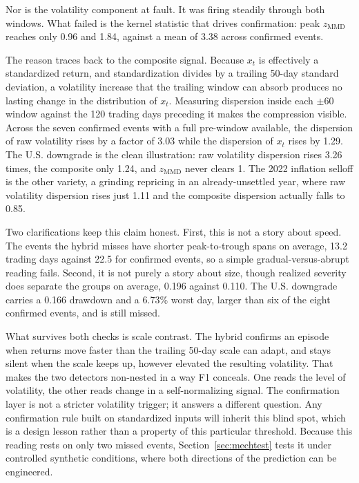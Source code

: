 \documentclass[pdflatex,sn-mathphys-num,iicol]{sn-jnl}
\begin{document}
Nor is the volatility component at fault. It was firing steadily through both windows. What failed is the kernel statistic that drives confirmation: peak $z_{\mathrm{MMD}}$ reaches only 0.96 and 1.84, against a mean of 3.38 across confirmed events.

The reason traces back to the composite signal. Because $x_t$ is effectively a standardized return, and standardization divides by a trailing 50-day standard deviation, a volatility increase that the trailing window can absorb produces no lasting change in the distribution of $x_t$. Measuring dispersion inside each $\pm60$ window against the 120 trading days preceding it makes the compression visible. Across the seven confirmed events with a full pre-window available, the dispersion of raw volatility rises by a factor of 3.03 while the dispersion of $x_t$ rises by 1.29. The U.S. downgrade is the clean illustration: raw volatility dispersion rises 3.26 times, the composite only 1.24, and $z_{\mathrm{MMD}}$ never clears 1. The 2022 inflation selloff is the other variety, a grinding repricing in an already-unsettled year, where raw volatility dispersion rises just 1.11 and the composite dispersion actually falls to 0.85.

Two clarifications keep this claim honest. First, this is not a story about speed. The events the hybrid misses have shorter peak-to-trough spans on average, 13.2 trading days against 22.5 for confirmed events, so a simple gradual-versus-abrupt reading fails. Second, it is not purely a story about size, though realized severity does separate the groups on average, 0.196 against 0.110. The U.S. downgrade carries a 0.166 drawdown and a 6.73\% worst day, larger than six of the eight confirmed events, and is still missed.

What survives both checks is scale contrast. The hybrid confirms an episode when returns move faster than the trailing 50-day scale can adapt, and stays silent when the scale keeps up, however elevated the resulting volatility. That makes the two detectors non-nested in a way F1 conceals. One reads the level of volatility, the other reads change in a self-normalizing signal. The confirmation layer is not a stricter volatility trigger; it answers a different question. Any confirmation rule built on standardized inputs will inherit this blind spot, which is a design lesson rather than a property of this particular threshold. Because this reading rests on only two missed events, Section~\ref{sec:mechtest} tests it under controlled synthetic conditions, where both directions of the prediction can be engineered.
\end{document}
